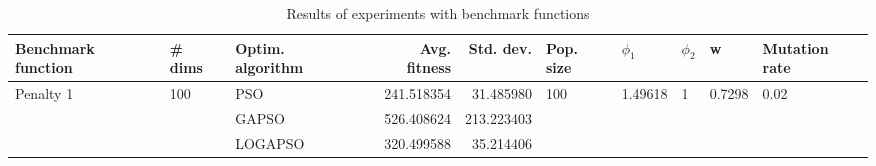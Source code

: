 \begin{table}
\centering
\caption{Results of experiments with benchmark functions}
\begin{tabular}{lllrrlllll}
\toprule
        Benchmark function &              \# dims & Optim. algorithm &  Avg. fitness &  Std. dev. &            Pop. size &               $\phi_{1}$ &         $\phi_{2}$ &                       w &         Mutation rate \\
\midrule
\multirow{3}{*}{Penalty 1} & \multirow{3}{*}{100} &              PSO &    241.518354 &  31.485980 & \multirow{3}{*}{100} & \multirow{3}{*}{1.49618} & \multirow{3}{*}{1} & \multirow{3}{*}{0.7298} & \multirow{3}{*}{0.02} \\
                           &                      &            GAPSO &    526.408624 & 213.223403 &                      &                          &                    &                         &                       \\
                           &                      &          LOGAPSO &    320.499588 &  35.214406 &                      &                          &                    &                         &                       \\
\bottomrule
\end{tabular}
\end{table}
